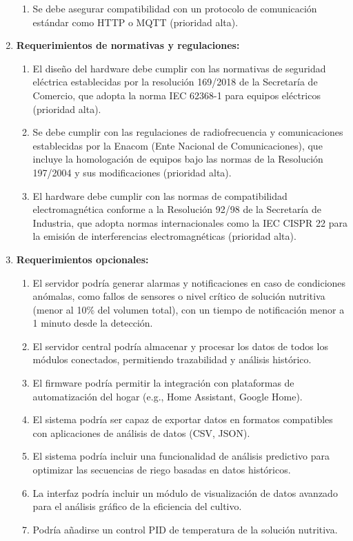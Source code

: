 \documentclass[
11pt, %
]{charter}
\begin{document}
\begin{enumerate}
	\begin{enumerate}
	\item Se debe asegurar compatibilidad con un protocolo de comunicación estándar como HTTP o MQTT (prioridad alta).
	\end{enumerate}
	\item \textbf{Requerimientos de normativas y regulaciones:}
	\begin{enumerate}
	\item El diseño del hardware debe cumplir con las normativas de seguridad eléctrica establecidas por la resolución 169/2018 de la Secretaría de Comercio, que adopta la norma IEC 62368-1 para equipos eléctricos (prioridad alta).
	\item  Se debe cumplir con las regulaciones de radiofrecuencia y comunicaciones establecidas por la Enacom (Ente Nacional de Comunicaciones), que incluye la homologación de equipos bajo las normas de la Resolución 197/2004 y sus modificaciones (prioridad alta).
	\item El hardware debe cumplir con las normas de compatibilidad electromagnética conforme a la Resolución 92/98 de la Secretaría de Industria, que adopta normas internacionales como la IEC CISPR 22 para la emisión de interferencias electromagnéticas (prioridad alta).
	\end{enumerate}
	\item \textbf{Requerimientos opcionales:}
	\begin{enumerate}
	    \item El servidor podría generar alarmas y notificaciones en caso de condiciones anómalas, como fallos de sensores o nivel crítico de solución nutritiva (menor al 10\% del volumen total), con un tiempo de notificación menor a 1 minuto desde la detección.
       \item El servidor central podría almacenar y procesar los datos de todos los módulos conectados, permitiendo trazabilidad y análisis histórico.
	\item El firmware podría permitir la integración con plataformas de automatización del hogar (e.g., Home Assistant, Google Home).
	\item El sistema podría ser capaz de exportar datos en formatos compatibles con aplicaciones de análisis de datos (CSV, JSON).
	\item El sistema podría incluir una funcionalidad de análisis predictivo para optimizar las secuencias de riego basadas en datos históricos.
	\item La interfaz podría incluir un módulo de visualización de datos avanzado para el análisis gráfico de la eficiencia del cultivo.
	\item Podría añadirse un control PID de temperatura de la solución nutritiva.
	\end{enumerate}
\end{enumerate}
\end{document}
